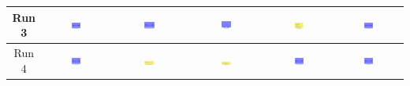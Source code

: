 \begin{table}[H]
\begin{tabular}{|c|c|c|c|c|c|}
    \hline
    Run 3 & \includegraphics[width=0.15\textwidth]{./run_3/png/gpt-4o_results/MicrofluidicChip.png} & \includegraphics[width=0.15\textwidth]{./run_3/png/claude-3-5-sonnet-20240620_results/MicrofluidicChip.png} & \includegraphics[width=0.15\textwidth]{./run_3/png/watsonx_meta-llama_llama-3-1-70b-instruct_results/MicrofluidicChip.png} & \includegraphics[width=0.15\textwidth]{./run_3/png/watsonx_meta-llama_llama-3-405b-instruct_results/MicrofluidicChip.png} & \includegraphics[width=0.15\textwidth]{./run_3/png/o1-preview_results/MicrofluidicChip.png} \\
    \hline
    Run 4 & \includegraphics[width=0.15\textwidth]{./run_4/png/gpt-4o_results/MicrofluidicChip.png} & \includegraphics[width=0.15\textwidth]{./run_4/png/claude-3-5-sonnet-20240620_results/MicrofluidicChip.png} & \includegraphics[width=0.15\textwidth]{./run_4/png/watsonx_meta-llama_llama-3-1-70b-instruct_results/MicrofluidicChip.png} & \includegraphics[width=0.15\textwidth]{./run_4/png/watsonx_meta-llama_llama-3-405b-instruct_results/MicrofluidicChip.png} & \includegraphics[width=0.15\textwidth]{./run_4/png/o1-preview_results/MicrofluidicChip.png} \\

\end{tabular}
\end{table}
